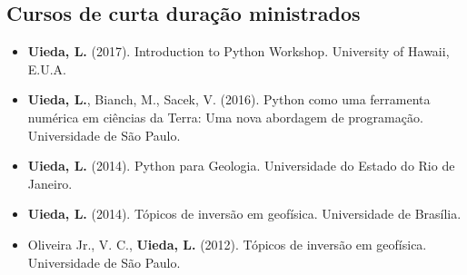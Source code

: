 \subsection{Cursos de curta duração ministrados}

\begin{itemize}
    \item \textbf{Uieda, L.} (2017). Introduction to Python Workshop.
        University of Hawaii, E.U.A.
    \item \textbf{Uieda, L.}, Bianch, M., Sacek, V. (2016).
        Python como uma ferramenta numérica em ciências da Terra: Uma nova
        abordagem de programação. Universidade de São Paulo.
    \item \textbf{Uieda, L.} (2014). Python para Geologia. Universidade do
        Estado do Rio de Janeiro.
    \item \textbf{Uieda, L.} (2014). Tópicos de inversão em geofísica.
        Universidade de Brasília.
    \item Oliveira Jr., V. C., \textbf{Uieda, L.} (2012). Tópicos de inversão
        em geofísica.  Universidade de São Paulo.
\end{itemize}

